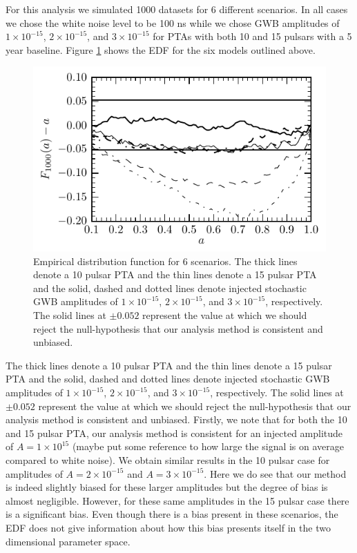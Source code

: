 \documentclass[iop]{emulateapj}
\begin{document}
For this analysis we simulated 1000 datasets for 6 different scenarios. In all cases we chose the white noise level to be 100 ns while we chose GWB amplitudes of $1\times 10^{-15}$, $2\times 10^{-15}$, and $3\times 10^{-15}$ for PTAs with both 10 and 15 pulsars with a 5 year baseline. Figure \ref{fig:combined_edf} shows the EDF for the six models outlined above. 
\begin{figure}[!h]
  \begin{center}
	\includegraphics[width=\columnwidth]{edf_all.pdf}
  \end{center}
  \caption{Empirical distribution function for 6 scenarios. The thick lines denote a 10 pulsar PTA and the thin lines denote a 15 pulsar PTA and the solid, dashed and dotted lines denote injected stochastic GWB amplitudes of  $1\times 10^{-15}$, $2\times 10^{-15}$, and $3\times 10^{-15}$, respectively. The solid lines at $\pm 0.052$ represent the value at which we should reject the null-hypothesis that our analysis method is consistent and unbiased. }
\label{fig:combined_edf}
\end{figure}
The thick lines denote a 10 pulsar PTA and the thin lines denote a 15 pulsar PTA and the solid, dashed and dotted lines denote injected stochastic GWB amplitudes of  $1\times 10^{-15}$, $2\times 10^{-15}$, and $3\times 10^{-15}$, respectively. The solid lines at $\pm 0.052$ represent the value at which we should reject the null-hypothesis that our analysis method is consistent and unbiased. Firstly, we note that for both the 10 and 15 pulsar PTA, our analysis method is consistent for an injected amplitude of $A=1\times 10^{15}$ (maybe put some reference to how large the signal is on average compared to white noise). We obtain similar results in the 10 pulsar case for amplitudes of $A=2\times 10^{-15}$ and $A=3\times 10^{-15}$. Here we do see that our method is indeed slightly biased for these larger amplitudes but the degree of bias is almost negligible. However, for these same amplitudes in the 15 pulsar case there is a significant bias. Even though there is a bias present in these scenarios, the EDF does not give information about how this bias presents itself in the two dimensional parameter space. 
\end{document}
